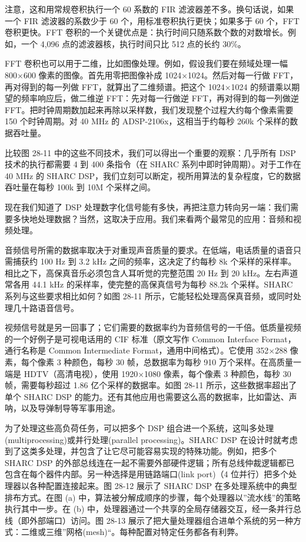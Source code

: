 注意，这和用常规卷积执行一个 60 系数的 FIR
滤波器差不多。换句话说，如果一个 FIR 滤波器的系数少于 60
个，用标准卷积执行更快；如果多于 60 个，FFT 卷积更快。FFT
卷积的一个关键优点是：执行时间只随系数个数的对数增长。例如，一个 4,096
点的滤波器核，执行时间只比 512 点的长约 30\%。

FFT 卷积也可以用于二维，比如图像处理。例如，假设我们要在频域处理一幅
800×600 像素的图像。首先用零把图像补成 1024×1024。然后对每一行做
FFT，再对得到的每一列做 FFT，就算出了二维频谱。把这个 1024×1024
的频谱乘以期望的频率响应后，做二维逆 FFT：先对每一行做逆
FFT，再对得到的每一列做逆
FFT。把时钟周期数加起来再除以采样数，我们发现整个过程大约每个像素需要
150 个时钟周期。对 40 MHz 的 ADSP-2106x，这相当于约每秒 260k
个采样的数据吞吐量。

比较图 28-11 中的这些不同技术，我们可以得出一个重要的观察：几乎所有 DSP
技术的执行都需要 4 到 400 条指令（在 SHARC
系列中即时钟周期）。对于工作在 40 MHz 的 SHARC
DSP，我们立刻可以断定，视所用算法的复杂程度，它的数据吞吐量在每秒 100k
到 10M 个采样之间。

现在我们知道了 DSP
处理数字化信号能有多快，再把注意力转向另一端：我们需要多快地处理数据？当然，这取决于应用。我们来看两个最常见的应用：音频和视频处理。

音频信号所需的数据率取决于对重现声音质量的要求。在低端，电话质量的语音只需捕获约
100 Hz 到 3.2 kHz 之间的频率，这决定了约每秒 8k
个采样的采样率。相比之下，高保真音乐必须包含人耳听觉的完整范围 20 Hz 到
20 kHz。左右声道常各用 44.1 kHz 的采样率，使完整的高保真信号为每秒 88.2k
个采样。SHARC 系列与这些要求相比如何？如图 28-11
所示，它能轻松处理高保真音频，或同时处理几十路语音信号。

视频信号就是另一回事了；它们需要的数据率约为音频信号的一千倍。低质量视频的一个好例子是可视电话用的
CIF 标准（原文写作 Common Interface Format，通行名称是 Common
Intermediate Format，通用中间格式）。它使用 352×288 像素，每个像素 3
种颜色，每秒 30 帧，总数据率为每秒 910 万个采样。在高质量一端是
HDTV（高清电视），使用 1920×1080 像素，每个像素 3 种颜色，每秒 30
帧，需要每秒超过 1.86 亿个采样的数据率。如图 28-11
所示，这些数据率超出了单个 SHARC DSP
的能力。还有其他应用也需要这么高的数据率，比如雷达、声呐，以及导弹制导等军事用途。

为了处理这些高负荷任务，可以把多个 DSP
组合进一个系统，这叫多处理(multiprocessing)或并行处理(parallel
processing)。SHARC DSP
在设计时就考虑到了这类多处理，并包含了让它尽可能容易实现的特殊功能。例如，把多个
SHARC DSP
的外部总线连在一起不需要外部硬件逻辑；所有总线仲裁逻辑都已包含在每个器件内部。另一种选择是用链路端口(link
port)（4 位并行）把多个处理器以各种配置连接起来。图 28-12 展示了 SHARC
DSP 在多处理系统中的典型排布方式。在图 (a)
中，算法被分解成顺序的步骤，每个处理器以''流水线''的策略执行其中一步。在
(b)
中，处理器通过一个共享的全局存储器交互，经一条并行总线（即外部端口）访问。图
28-13
展示了把大量处理器组合进单个系统的另一种方式：二维或三维''网格(mesh)``。每种配置对特定任务都各有利弊。

